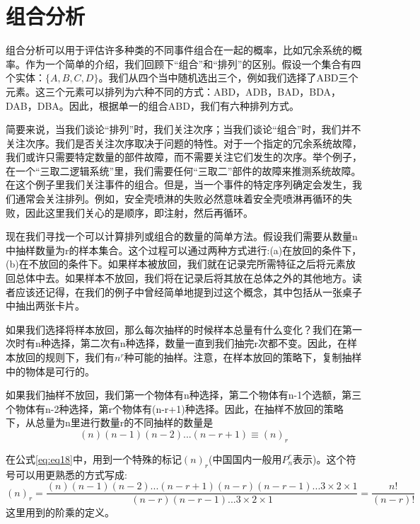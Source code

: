 \documentclass[cn,11pt,chinese]{elegantbook}
\begin{document}
\section{组合分析}

组合分析可以用于评估许多种类的不同事件组合在一起的概率，比如冗余系统的概率。作为一个简单的介绍，我们回顾下“组合”和“排列”的区别。假设一个集合有四个实体：$\{A,B,C,D\}$。我们从四个当中随机选出三个，例如我们选择了ABD三个元素。这三个元素可以排列为六种不同的方式：ABD，ADB，BAD，BDA，DAB，DBA。因此，根据单一的组合ABD，我们有六种排列方式。

简要来说，当我们谈论“排列”时，我们关注次序；当我们谈论“组合”时，我们并不关注次序。我们是否关注次序取决于问题的特性。对于一个指定的冗余系统故障，我们或许只需要特定数量的部件故障，而不需要关注它们发生的次序。举个例子，在一个“三取二逻辑系统”里，我们需要任何“三取二”部件的故障来推测系统故障。在这个例子里我们关注事件的组合。但是，当一个事件的特定序列确定会发生，我们通常会关注排列。例如，安全壳喷淋的失败必然意味着安全壳喷淋再循环的失败，因此这里我们关心的是顺序，即注射，然后再循环。

现在我们寻找一个可以计算排列或组合的数量的简单方法。假设我们需要从数量n中抽样数量为r的样本集合。这个过程可以通过两种方式进行:(a)在放回的条件下，(b)在不放回的条件下。如果样本被放回，我们就在记录完所需特征之后将元素放回总体中去。如果样本不放回，我们将在记录后将其放在总体之外的其他地方。读者应该还记得，在我们的例子中曾经简单地提到过这个概念，其中包括从一张桌子中抽出两张卡片。

如果我们选择将样本放回，那么每次抽样的时候样本总量有什么变化？我们在第一次时有n种选择，第二次有n种选择，数量一直到我们抽完r次都不变。因此，在样本放回的规则下，我们有$n^r$种可能的抽样。注意，在样本放回的策略下，复制抽样中的物体是可行的。

如果我们抽样不放回，我们第一个物体有n种选择，第二个物体有n-1个选额，第三个物体有n-2种选择，第r个物体有(n-r+1)种选择。因此，在抽样不放回的策略下，从总量为n里进行数量r的不同抽样的数量是
\begin{equation}\label{eq:eq18}
(n)(n-1)(n-2)...(n-r+1)\equiv (n)_r 	
\end{equation}

在公式\ref{eq:eq18}中，用到一个特殊的标记$(n)_r$(中国国内一般用$P_n^r$表示)。这个符号可以用更熟悉的方式写成:
\begin{equation}\label{eq:eq19}
(n)_r = \frac{(n)(n-1)(n-2)...(n-r+1)(n-r)(n-r-1)...3\times 2\times 1}{(n-r)(n-r-1)...3\times 2\times 1} = \frac{n!}{(n-r)!} 
\end{equation}
这里用到的阶乘的定义。
\end{document}
